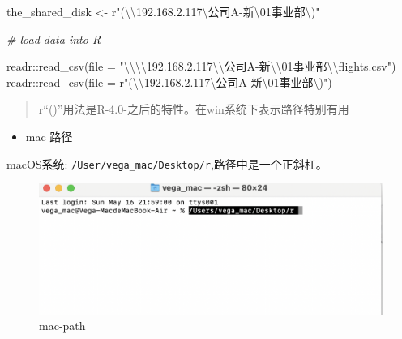 \documentclass[
]{book}
\newenvironment{Shaded}{\begin{snugshade}}{\end{snugshade}}
\newcommand{\AttributeTok}[1]{\textcolor[rgb]{0.77,0.63,0.00}{#1}}
\newcommand{\CommentTok}[1]{\textcolor[rgb]{0.56,0.35,0.01}{\textit{#1}}}
\newcommand{\FunctionTok}[1]{\textcolor[rgb]{0.00,0.00,0.00}{#1}}
\newcommand{\NormalTok}[1]{#1}
\newcommand{\OtherTok}[1]{\textcolor[rgb]{0.56,0.35,0.01}{#1}}
\newcommand{\SpecialCharTok}[1]{\textcolor[rgb]{0.00,0.00,0.00}{#1}}
\newcommand{\StringTok}[1]{\textcolor[rgb]{0.31,0.60,0.02}{#1}}
\providecommand{\tightlist}{%
  \setlength{\itemsep}{0pt}\setlength{\parskip}{0pt}}
\begin{document}
\begin{Shaded}
\begin{Highlighting}[]
\NormalTok{the\_shared\_disk }\OtherTok{\textless{}{-}}\NormalTok{ r}\StringTok{"(}\SpecialCharTok{\textbackslash{}\textbackslash{}}\StringTok{192.168.2.117\textbackslash{}公司A{-}新}\SpecialCharTok{\textbackslash{}01}\StringTok{事业部\textbackslash{})"}

\CommentTok{\# load data into R}

\NormalTok{readr}\SpecialCharTok{::}\FunctionTok{read\_csv}\NormalTok{(}\AttributeTok{file =} \StringTok{"}\SpecialCharTok{\textbackslash{}\textbackslash{}\textbackslash{}\textbackslash{}}\StringTok{192.168.2.117}\SpecialCharTok{\textbackslash{}\textbackslash{}}\StringTok{公司A{-}新}\SpecialCharTok{\textbackslash{}\textbackslash{}}\StringTok{01事业部}\SpecialCharTok{\textbackslash{}\textbackslash{}}\StringTok{flights.csv"}\NormalTok{)}
\NormalTok{readr}\SpecialCharTok{::}\FunctionTok{read\_csv}\NormalTok{(}\AttributeTok{file =}\NormalTok{ r}\StringTok{"(}\SpecialCharTok{\textbackslash{}\textbackslash{}}\StringTok{192.168.2.117\textbackslash{}公司A{-}新}\SpecialCharTok{\textbackslash{}01}\StringTok{事业部\textbackslash{})"}\NormalTok{)}
\end{Highlighting}
\end{Shaded}

\begin{quote}
r``()''用法是R-4.0-之后的特性。在win系统下表示路径特别有用
\end{quote}

\begin{itemize}
\tightlist
\item
  mac 路径
\end{itemize}

macOS系统: \texttt{/User/vega\_mac/Desktop/r},路径中是一个正斜杠。

\begin{figure}
\centering
\includegraphics{picture/read-write/mac-path.png}
\caption{mac-path}
\end{figure}
\end{document}
